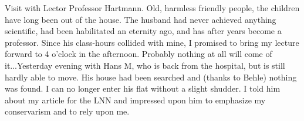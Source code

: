
Visit with Lector Professor Hartmann. Old, harmless friendly people, the children have long been out of the house. The husband had never achieved anything scientific, had been habilitated an eternity ago, and has after years become a professor. Since his class-hours collided with mine, I promised to bring my lecture forward to 4 o'clock in the afternoon. Probably nothing at all will come of it...Yesterday evening with Hans M, who is back from the hospital, but is still hardly able to move. His house had been searched and (thanks to Behle) nothing was found. I can no longer enter his flat without a slight shudder. I told him about my article for the LNN and impressed upon him to emphasize my conservarism and to rely upon me.

\missing

